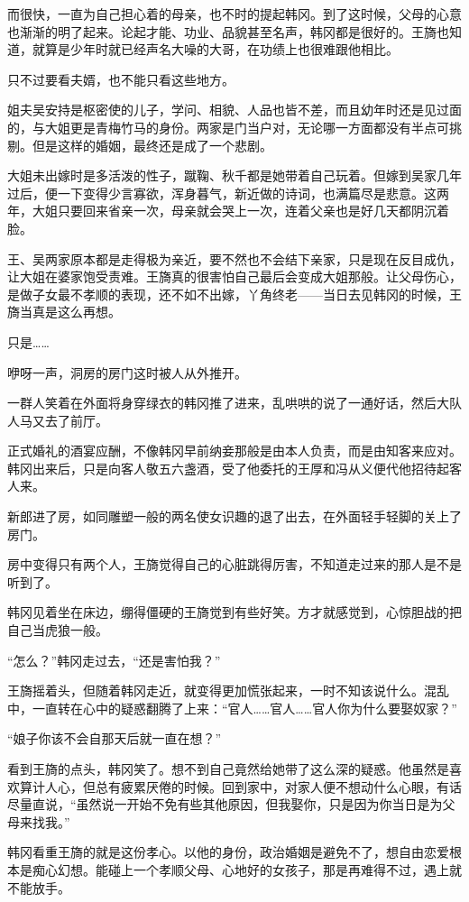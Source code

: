 而很快，一直为自己担心着的母亲，也不时的提起韩冈。到了这时候，父母的心意也渐渐的明了起来。论起才能、功业、品貌甚至名声，韩冈都是很好的。王旖也知道，就算是少年时就已经声名大噪的大哥，在功绩上也很难跟他相比。

只不过要看夫婿，也不能只看这些地方。

姐夫吴安持是枢密使的儿子，学问、相貌、人品也皆不差，而且幼年时还是见过面的，与大姐更是青梅竹马的身份。两家是门当户对，无论哪一方面都没有半点可挑剔。但是这样的婚姻，最终还是成了一个悲剧。

大姐未出嫁时是多活泼的性子，蹴鞠、秋千都是她带着自己玩着。但嫁到吴家几年过后，便一下变得少言寡欲，浑身暮气，新近做的诗词，也满篇尽是悲意。这两年，大姐只要回来省亲一次，母亲就会哭上一次，连着父亲也是好几天都阴沉着脸。

王、吴两家原本都是走得极为亲近，要不然也不会结下亲家，只是现在反目成仇，让大姐在婆家饱受责难。王旖真的很害怕自己最后会变成大姐那般。让父母伤心，是做子女最不孝顺的表现，还不如不出嫁，丫角终老——当日去见韩冈的时候，王旖当真是这么再想。

只是……

咿呀一声，洞房的房门这时被人从外推开。

一群人笑着在外面将身穿绿衣的韩冈推了进来，乱哄哄的说了一通好话，然后大队人马又去了前厅。

正式婚礼的酒宴应酬，不像韩冈早前纳妾那般是由本人负责，而是由知客来应对。韩冈出来后，只是向客人敬五六盏酒，受了他委托的王厚和冯从义便代他招待起客人来。

新郎进了房，如同雕塑一般的两名使女识趣的退了出去，在外面轻手轻脚的关上了房门。

房中变得只有两个人，王旖觉得自己的心脏跳得厉害，不知道走过来的那人是不是听到了。

韩冈见着坐在床边，绷得僵硬的王旖觉到有些好笑。方才就感觉到，心惊胆战的把自己当虎狼一般。

“怎么？”韩冈走过去，“还是害怕我？”

王旖摇着头，但随着韩冈走近，就变得更加慌张起来，一时不知该说什么。混乱中，一直转在心中的疑惑翻腾了上来：“官人……官人……官人你为什么要娶奴家？”

“娘子你该不会自那天后就一直在想？”

看到王旖的点头，韩冈笑了。想不到自己竟然给她带了这么深的疑惑。他虽然是喜欢算计人心，但总有疲累厌倦的时候。回到家中，对家人便不想动什么心眼，有话尽量直说，“虽然说一开始不免有些其他原因，但我娶你，只是因为你当日是为父母来找我。”

韩冈看重王旖的就是这份孝心。以他的身份，政治婚姻是避免不了，想自由恋爱根本是痴心幻想。能碰上一个孝顺父母、心地好的女孩子，那是再难得不过，遇上就不能放手。


